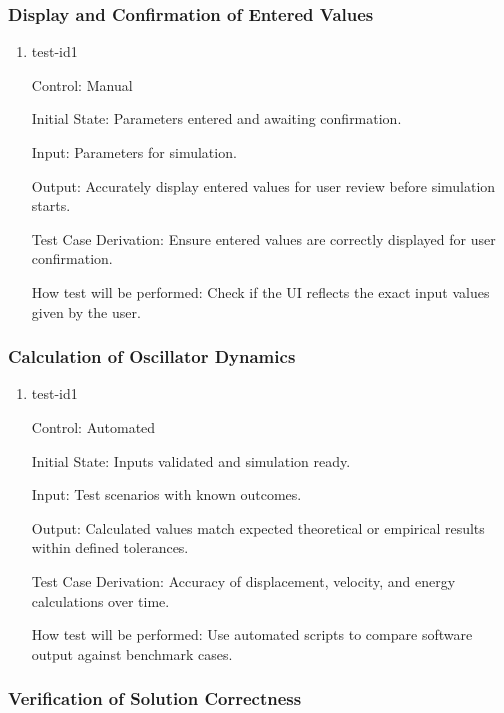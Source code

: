 \documentclass[12pt, titlepage]{article}
\begin{document}
\subsubsection{Display and Confirmation of Entered Values}

\begin{enumerate}

\item{test-id1\\}

Control: Manual
					
Initial State: Parameters entered and awaiting confirmation.
					
Input: Parameters for simulation.
					
Output: Accurately display entered values for user review before simulation starts.

Test Case Derivation: Ensure entered values are correctly displayed for user confirmation.
					
How test will be performed: Check if the UI reflects the exact input values given by the user.

\end{enumerate}


\subsubsection{Calculation of Oscillator Dynamics}

\begin{enumerate}

\item{test-id1\\}

Control: Automated
					
Initial State: Inputs validated and simulation ready.
					
Input: Test scenarios with known outcomes.
					
Output: Calculated values match expected theoretical or empirical results within defined 
tolerances.

Test Case Derivation: Accuracy of displacement, velocity, and energy calculations over time.
					
How test will be performed: Use automated scripts to compare software output against 
benchmark cases.

\end{enumerate}

\subsubsection{Verification of Solution Correctness}
\end{document}

